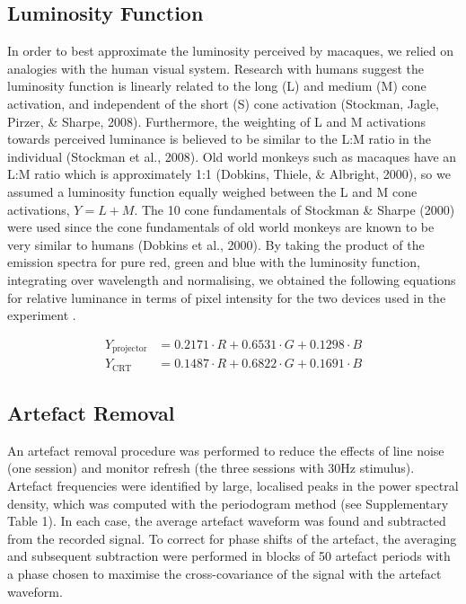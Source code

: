 \subsection{Luminosity Function}
In order to best approximate the luminosity perceived by macaques, we relied on analogies with the human visual system.
Research with humans suggest the luminosity function is linearly related to the long (L) and medium (M) cone activation, and independent of the short (S) cone activation (Stockman, Jagle, Pirzer, \& Sharpe, 2008).
Furthermore, the weighting of L and M activations towards perceived luminance is believed to be similar to the L:M ratio in the individual (Stockman et al., 2008).
Old world monkeys such as macaques have an L:M ratio which is approximately 1:1 (Dobkins, Thiele, \& Albright, 2000), so we assumed a luminosity function equally weighed between the L and M cone activations,  $Y=L+M$.
The 10{\textdegree} cone fundamentals of Stockman \& Sharpe (2000) were used since the cone fundamentals of old world monkeys are known to be very similar to humans (Dobkins et al., 2000).
By taking the product of the emission spectra for pure red, green and blue with the luminosity function, integrating over wavelength and normalising, we obtained the following equations for relative luminance in terms of pixel intensity for the two devices used in the experiment .

\begin{align*}
    Y_{\text{projector}} &= 0.2171 \cdot R + 0.6531 \cdot G + 0.1298 \cdot B\\
    Y_{\text{CRT}}       &= 0.1487 \cdot R + 0.6822 \cdot G + 0.1691 \cdot B
\end{align*}

\subsection{Artefact Removal}
An artefact removal procedure was performed to reduce the effects of line noise (one session) and monitor refresh (the three sessions with 30Hz stimulus).
Artefact frequencies were identified by large, localised peaks in the power spectral density, which was computed with the periodogram method (see Supplementary Table 1).
In each case, the average artefact waveform was found and subtracted from the recorded signal.
To correct for phase shifts of the artefact, the averaging and subsequent subtraction were performed in blocks of 50 artefact periods with a phase chosen to maximise the cross-covariance of the signal with the artefact waveform.

